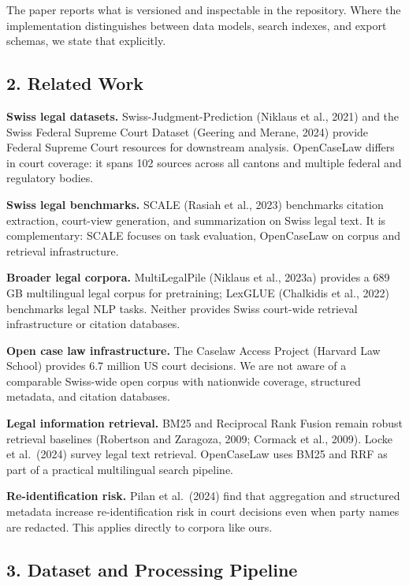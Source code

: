 \documentclass[
  11pt,
]{article}
\begin{document}
The paper reports what is versioned and inspectable in the repository.
Where the implementation distinguishes between data models, search
indexes, and export schemas, we state that explicitly.

\subsection{2. Related Work}\label{related-work}

\textbf{Swiss legal datasets.} Swiss-Judgment-Prediction (Niklaus et
al., 2021) and the Swiss Federal Supreme Court Dataset (Geering and
Merane, 2024) provide Federal Supreme Court resources for downstream
analysis. OpenCaseLaw differs in court coverage: it spans 102 sources
across all cantons and multiple federal and regulatory bodies.

\textbf{Swiss legal benchmarks.} SCALE (Rasiah et al., 2023) benchmarks
citation extraction, court-view generation, and summarization on Swiss
legal text. It is complementary: SCALE focuses on task evaluation,
OpenCaseLaw on corpus and retrieval infrastructure.

\textbf{Broader legal corpora.} MultiLegalPile (Niklaus et al., 2023a)
provides a 689 GB multilingual legal corpus for pretraining; LexGLUE
(Chalkidis et al., 2022) benchmarks legal NLP tasks. Neither provides
Swiss court-wide retrieval infrastructure or citation databases.

\textbf{Open case law infrastructure.} The Caselaw Access Project
(Harvard Law School) provides 6.7 million US court decisions. We are not
aware of a comparable Swiss-wide open corpus with nationwide coverage,
structured metadata, and citation databases.

\textbf{Legal information retrieval.} BM25 and Reciprocal Rank Fusion
remain robust retrieval baselines (Robertson and Zaragoza, 2009; Cormack
et al., 2009). Locke et al.~(2024) survey legal text retrieval.
OpenCaseLaw uses BM25 and RRF as part of a practical multilingual search
pipeline.

\textbf{Re-identification risk.} Pilan et al.~(2024) find that
aggregation and structured metadata increase re-identification risk in
court decisions even when party names are redacted. This applies
directly to corpora like ours.

\subsection{3. Dataset and Processing
Pipeline}\label{dataset-and-processing-pipeline}
\end{document}
